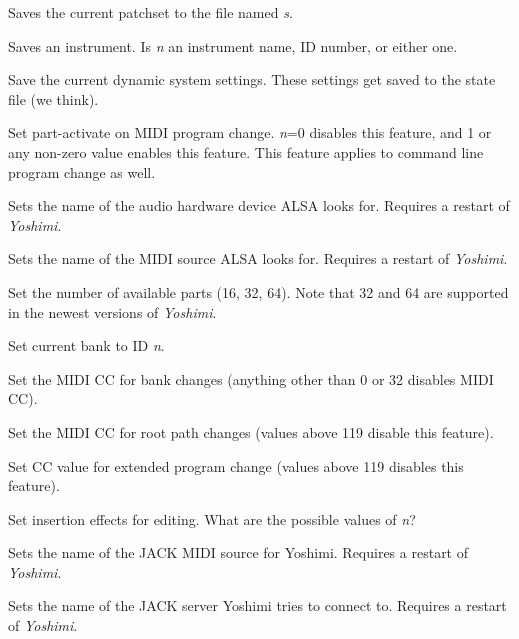       Saves the current patchset to the file named \textsl{s}.

      Saves an instrument.
      Is \textsl{n} an instrument name, ID number, or either one.

      Save the current dynamic system settings.
      These settings get saved to the state file (we think).

      Set part-activate on MIDI program change.
      \textsl{n}=0 disables this feature, and
      1 or any non-zero value enables this feature.
      This feature applies to command line program change as well.

      Sets the name of the audio hardware device ALSA looks for.
      Requires a restart of \textsl{Yoshimi}.

      Sets the name of the MIDI source ALSA looks for.
      Requires a restart of \textsl{Yoshimi}.

      Set the number of available parts (16, 32, 64).
      Note that 32 and 64 are supported in the newest versions of
      \textsl{Yoshimi}.

      Set current bank to ID \textsl{n}.

      Set the MIDI CC for bank changes (anything other than 0 or 32
      disables MIDI CC).

      Set the MIDI CC for root path changes (values above 119 disable this
      feature).

      Set CC value for extended program change (values above 119 disables this
      feature).

      Set insertion effects for editing.
      What are the possible values of \textsl{n}?

      Sets the name of the JACK MIDI source for Yoshimi.
      Requires a restart of \textsl{Yoshimi}.

      Sets the name of the JACK server Yoshimi tries to connect to.
      Requires a restart of \textsl{Yoshimi}.

